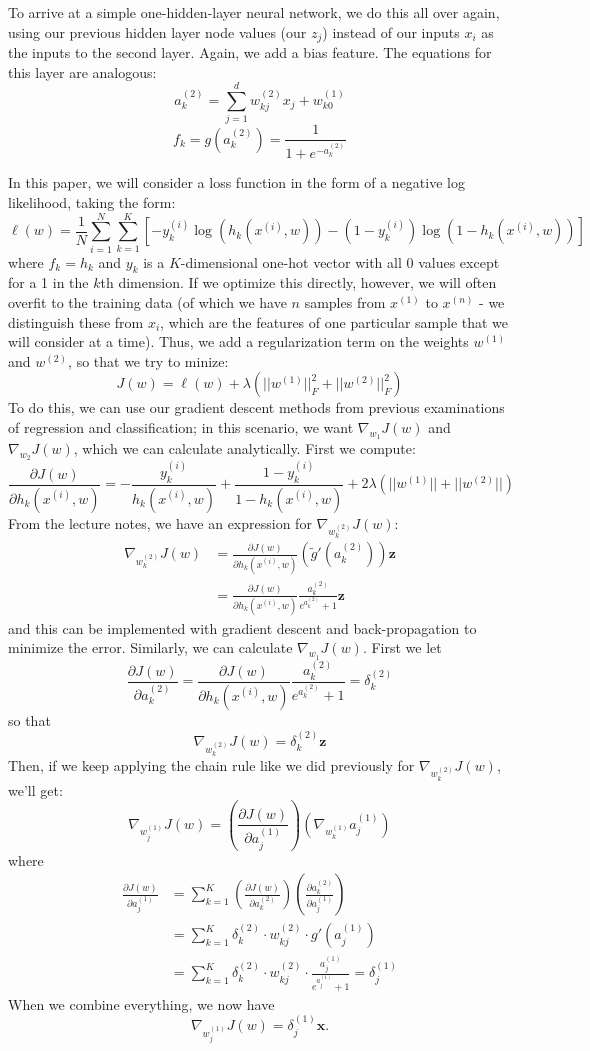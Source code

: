 \documentclass[11pt,letterpaper]{article}
\begin{document}
To arrive at a simple one-hidden-layer neural network, we do this all over again, using our previous hidden layer node values (our $z_j$) instead of our inputs $x_i$ as the inputs to the second layer. Again, we add a bias feature. The equations for this layer are analogous:
$$a_k^{(2)} = \sum_{j=1}^d w_{kj}^{(2)}x_j+w_{k0}^{(1)}$$
$$f_k = g(a_k^{(2)}) = \frac{1}{1 + e^{-a_k^{(2)}}}$$

In this paper, we will consider a loss function in the form of a negative log likelihood, taking the form:
$$\ell(w) = \frac{1}{N}\sum_{i=1}^N\sum_{k=1}^K\left[-y_k^{(i)}\log(h_k(x^{(i)},w))-(1-y_k^{(i)})\log(1-h_k(x^{(i)},w))\right]$$
where $f_k=h_k$ and $y_k$ is a $K$-dimensional one-hot vector with all 0 values except for a 1 in the $k$th dimension. If we optimize this directly, however, we will often overfit to the training data (of which we have $n$ samples from $x^{(1)}$ to $x^{(n)}$ - we distinguish these from $x_i$, which are the features of one particular sample that we will consider at a time). Thus, we add a regularization term on the weights $w^{(1)}$ and $w^{(2)}$, so that we try to minize:
$$J(w) = \ell(w)+\lambda(||w^{(1)}||_F^2+||w^{(2)}||_F^2)$$
To do this, we can use our gradient descent methods from previous examinations of regression and classification; in this scenario, we want $\nabla_{w_1}J(w)$ and $\nabla_{w_2}J(w)$, which we can calculate analytically. First we compute:
$$\frac{\partial J(w)}{\partial h_k(x^{(i)},w)}=-\frac{y_k^{(i)}}{h_k(x^{(i)},w)}+\frac{1-y_k^{(i)}}{1-h_k(x^{(i)},w)}+2\lambda(||w^{(1)}||+||w^{(2)}||)$$
From the lecture notes, we have an expression for $\nabla_{w^{(2)}_k}J(w)$:
\begin{align*}
\nabla_{w^{(2)}_k}J(w)&=\frac{\partial J(w)}{\partial h_k(x^{(i)},w)}(\tilde{g}'(a_k^{(2)}))\textbf{z}\\
&=\frac{\partial J(w)}{\partial h_k(x^{(i)},w)}\frac{a_k^{(2)}}{e^{a_k^{(2)}}+1}\textbf{z}
\end{align*}
and this can be implemented with gradient descent and back-propagation to minimize the error. Similarly, we can calculate $\nabla_{w_1}J(w)$. First we let
$$\frac{\partial J(w)}{\partial a_k^{(2)}}=\frac{\partial J(w)}{\partial h_k(x^{(i)},w)}\frac{a_k^{(2)}}{e^{a_k^{(2)}}+1}=\delta_k^{(2)}$$
so that
$$\nabla_{w^{(2)}_k}J(w)=\delta_k^{(2)}\textbf{z}$$
Then, if we keep applying the chain rule like we did previously for $\nabla_{w^{(2)}_k}J(w)$, we'll get:
$$\nabla_{w^{(1)}_j}J(w)=\left(\frac{\partial J(w)}{\partial a_j^{(1)}}\right)\left(\nabla_{w^{(1)}_k}a_j^{(1)}\right)$$
where
\begin{align*}
\frac{\partial J(w)}{\partial a_j^{(1)}}&=\sum_{k=1}^K\left(\frac{\partial J(w)}{\partial a_k^{(2)}}\right)\left(\frac{\partial a_k^{(2)}}{\partial a_j^{(1)}}\right)\\
&=\sum_{k=1}^K\delta_k^{(2)}\cdot w_{kj}^{(2)}\cdot g'(a_j^{(1)})\\
&=\sum_{k=1}^K\delta_k^{(2)}\cdot w_{kj}^{(2)}\cdot \frac{a_j^{(1)}}{e^{a_j^{(1)}}+1} = \delta_j^{(1)}
\end{align*}
When we combine everything, we now have
$$\nabla_{w^{(1)}_j}J(w)=\delta_j^{(1)}\textbf{x}.$$
\end{document}
